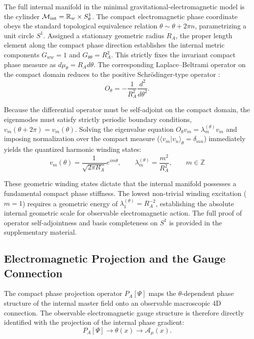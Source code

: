 \documentclass[11pt]{article}
\begin{document}
The full internal manifold in the minimal gravitational-electromagnetic model \cite{Kaluza1921} is the cylinder $\mathcal{M}_{\rm int} = \mathbb{R}_w \times S^1_\theta$. The compact electromagnetic phase coordinate obeys the standard topological equivalence relation $\theta \sim \theta + 2\pi n$, parametrizing a unit circle $S^1$. Assigned a stationary geometric radius $R_A$, the proper length element along the compact phase direction establishes the internal metric components $G_{ww} = 1$ and $G_{\theta\theta} = R_A^2$. This strictly fixes the invariant compact phase measure as $d\mu_\theta = R_A d\theta$.  The corresponding Laplace–Beltrami operator on the compact domain reduces to the positive Schrödinger-type operator \cite{dirac1931, Messiah1961}:
\begin{equation}
O_\theta = -\frac{1}{R_A^2} \frac{d^2}{d\theta^2}.
\end{equation}

Because the differential operator must be self-adjoint on the compact domain, the eigenmodes must satisfy strictly periodic boundary conditions, $v_m(\theta + 2\pi) = v_m(\theta)$. Solving the eigenvalue equation $O_\theta v_m = \lambda_m^{(\theta)} v_m$ and imposing normalization over the compact measure ($\langle v_m | v_n \rangle_\theta = \delta_{mn}$) immediately yields the quantized harmonic winding states:
\begin{equation}
\boxed{ v_m(\theta) = \frac{1}{\sqrt{2\pi R_A}} e^{im\theta}, \qquad \lambda_m^{(\theta)} = \frac{m^2}{R_A^2}, \qquad m \in \mathbb{Z} }
\end{equation}

These geometric winding states dictate that the internal manifold possesses a fundamental compact phase stiffness. The lowest non-trivial winding excitation ($m=1$) requires a geometric energy of $\lambda_1^{(\theta)} = R_A^{-2}$, establishing the absolute internal geometric scale for observable electromagnetic action. The full proof of operator self-adjointness and basis completeness on \(S^1\) is provided in the supplementary material.

\subsection{Electromagnetic Projection and the Gauge Connection}
\label{sec:electromagnetic_projection}

The compact phase projection operator $P_A[\Psi]$ maps the $\theta$-dependent phase structure of the internal master field onto an observable macroscopic 4D connection. The observable electromagnetic gauge structure is therefore directly identified with the projection of the internal phase gradient:
\begin{equation}
P_A[\Psi] \rightarrow \theta(x) \longrightarrow\mathcal A_\mu(x).
\end{equation}
\end{document}

